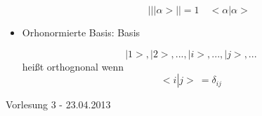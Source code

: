 \documentclass[10pt,article,colorback,accentcolor=tud9d]{scrartcl}
\begin{document}
\begin{itemize}
\begin{itemize}
\begin{fleqn}
\begin{equation}
\left|\right|\left|\right.\alpha>\left|\right| =1 \quad <\alpha\left|\right.
\alpha>
\end{equation}
\end{fleqn}
\end{itemize}
\item Orhonormierte Basis: Basis
\begin{fleqn}
\begin{equation} \nonumber
{\left|\right.1>,\left|\right.2>,...,\left|\right.i>,...,\left|\right.j>,...}
\end{equation}
heißt orthognonal wenn
\begin{equation}
<i\left|\right. j> \ ={\delta}_{ij}
\end{equation}
\end{fleqn}
\end{itemize}
\begin{flushright}Vorlesung 3 - 23.04.2013\end{flushright}
\end{document}
